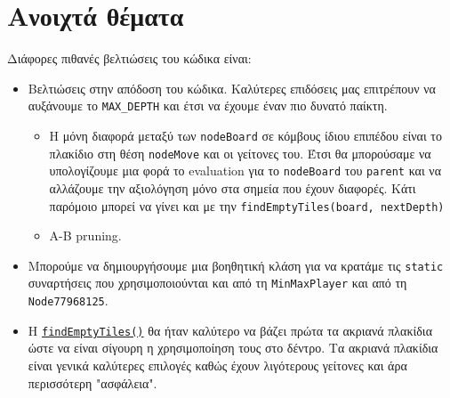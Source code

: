 \chapter{Ανοιχτά θέματα}
Διάφορες πιθανές βελτιώσεις του κώδικα είναι:
\begin{itemize}
    \item Βελτιώσεις στην απόδοση του κώδικα.
    Καλύτερες επιδόσεις μας επιτρέπουν να αυξάνουμε το \lstinline!MAX_DEPTH! και έτσι να έχουμε έναν πιο δυνατό παίκτη.
    \begin{itemize}
        \item Η μόνη διαφορά μεταξύ των \lstinline!nodeBoard! σε κόμβους ίδιου επιπέδου είναι το πλακίδιο στη θέση \lstinline!nodeMove! και οι γείτονες του.
        Έτσι θα μπορούσαμε να υπολογίζουμε μια φορά το evaluation για το \lstinline!nodeBoard! του \lstinline!parent! και να αλλάζουμε την αξιολόγηση μόνο στα σημεία που έχουν διαφορές.
        Κάτι παρόμοιο μπορεί να γίνει και με την \lstinline!findEmptyTiles(board, nextDepth)!

        \item A-B pruning.
    \end{itemize}

    \item Μπορούμε να δημιουργήσουμε μια βοηθητική κλάση για να κρατάμε τις \lstinline!static! συναρτήσεις που χρησιμοποιούνται και από τη \lstinline!MinMaxPlayer! και από τη \lstinline!Node77968125!.

    \item Η
    \hyperref[fun:findEmptyTiles]{\lstinline!findEmptyTiles()!}
    θα ήταν καλύτερο να βάζει πρώτα τα ακριανά πλακίδια ώστε να είναι σίγουρη η χρησιμοποίηση τους στο δέντρο.
    Τα ακριανά πλακίδια είναι γενικά καλύτερες επιλογές καθώς έχουν λιγότερους γείτονες και άρα περισσότερη "ασφάλεια".
\end{itemize}
